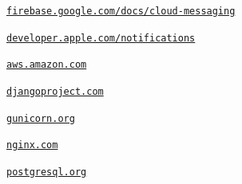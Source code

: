 \documentclass[licencjacka]{pracamgr}
\begin{document}
\begin{thebibliography}{99}
 \href{https://firebase.google.com/docs/cloud-messaging/}{\texttt{firebase.google.com/docs/cloud-messaging}}

 \href{https://developer.apple.com/notifications/}{\texttt{developer.apple.com/notifications}}

 \href{https://aws.amazon.com/}{\texttt{aws.amazon.com}}

 \href{https://www.djangoproject.com/}{\texttt{djangoproject.com}}

 \href{https://gunicorn.org/}{\texttt{gunicorn.org}}

 \href{https://www.nginx.com/}{\texttt{nginx.com}}

 \href{https://www.postgresql.org/}{\texttt{postgresql.org}}


\end{thebibliography}
\end{document}

